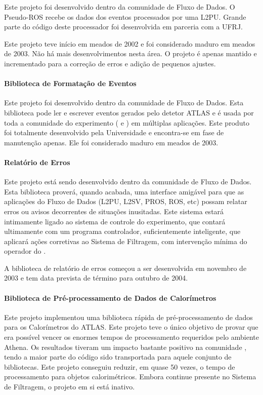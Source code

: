 Este projeto foi desenvolvido dentro da comunidade de Fluxo de Dados. O
Pseudo-ROS recebe os dados dos eventos processados por uma L2PU. Grande parte
do código deste processador foi desenvolvida em parceria com a UFRJ.

Este projeto teve início em meados de 2002 e foi considerado maduro em meados
de 2003. Não há mais desenvolvimentos nesta área. O projeto é apenas mantido e
incrementado para a correção de erros e adição de pequenos ajustes.

\paragraph{Biblioteca de Formatação de Eventos}

Este projeto foi desenvolvido dentro da comunidade de Fluxo de Dados. Esta
biblioteca pode ler e escrever eventos gerados pelo detetor ATLAS e é usada
por toda a comunidade do experimento ( e ) em
múltiplas aplicações. Este produto foi totalmente desenvolvido pela
Universidade e encontra-se em fase de manutenção apenas. Ele foi considerado
maduro em meados de 2003.

\paragraph{Relatório de Erros}

Este projeto está sendo desenvolvido dentro da comunidade de Fluxo de
Dados. Esta biblioteca proverá, quando acabada, uma interface amigável para
que as aplicações do Fluxo de Dados (L2PU, L2SV, PROS, ROS, etc) possam
relatar erros ou avisos decorrentes de situações inusitadas. Este sistema
estará intimamente ligado ao sistema de controle do experimento, que contará
ultimamente com um programa controlador, suficientemente inteligente, que
aplicará ações corretivas ao Sistema de Filtragem, com intervenção mínima do
operador do .

A biblioteca de relatório de erros começou a ser desenvolvida em novembro de
2003 e tem data prevista de término para outubro de 2004.

\paragraph{Biblioteca de Pré-processamento de Dados de Calorímetros}

Este projeto implementou uma biblioteca rápida de pré-processamento de dados
para os Calorímetros do ATLAS. Este projeto teve o único objetivo de provar
que era possível vencer os enormes tempos de processamento requeridos pelo
ambiente Athena. Os resultados tiveram um impacto bastante positivo na
comunidade , tendo a maior parte do código sido transportada para
aquele conjunto de bibliotecas. Este projeto conseguiu reduzir, em quase 50
vezes, o tempo de processamento para objetos calorimétricos. Embora continue
presente no Sistema de Filtragem, o projeto em si está inativo.

